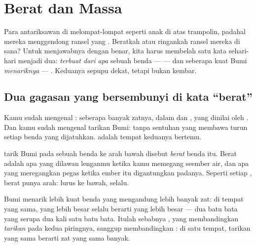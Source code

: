 \chapter{Berat dan Massa}\label{ch:g4:weight-and-mass}

Para antariksawan di  melompat-lompat seperti anak di atas
trampolin, padahal mereka menggendong ransel yang . Beratkah atau
ringankah ransel mereka di sana? Untuk menjawabnya dengan benar, kita
harus membelah satu kata sehari-hari menjadi dua: \emph{terbuat dari
apa} sebuah benda ---  --- dan seberapa kuat Bumi
\emph{menariknya} --- . Keduanya sepupu dekat, tetapi bukan
kembar.

\section{Dua gagasan yang bersembunyi di kata ``berat''}

Kamu sudah mengenal : seberapa banyak zatnya, dalam  dan
, yang dinilai oleh . Dan kamu sudah mengenal tarikan
Bumi:  tanpa sentuhan yang membawa turun setiap benda yang
dijatuhkan.  adalah tempat keduanya bertemu.

\begin{definition}[Berat]\label{def:g4:weight-and-mass:weight}
 tarik Bumi pada sebuah benda ke arah bawah disebut
\emph{berat} benda itu. Berat adalah apa yang dilawan
lenganmu ketika kamu memegang seember air, dan apa yang meregangkan
pegas ketika ember itu digantungkan padanya. Seperti setiap ,
berat punya arah: lurus ke bawah, selalu.
\end{definition}

\begin{proposition}\label{prop:g4:weight-and-mass:morestuff}
Bumi menarik lebih kuat benda yang mengandung lebih banyak zat: di
tempat yang sama,  yang lebih besar selalu berarti  yang
lebih besar --- dua batu bata yang serupa  dua kali  satu
batu bata. Itulah sebabnya , yang membandingkan \emph{tarikan}
pada kedua piringnya, sanggup membandingkan \emph{}: di satu
tempat, tarikan yang sama berarti zat yang sama banyak.
\end{proposition}

